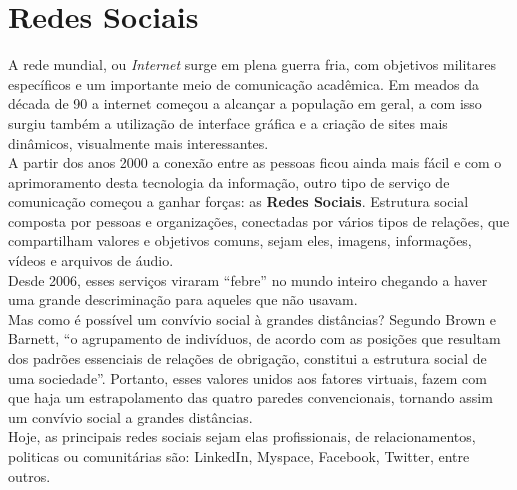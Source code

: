 \section{Redes Sociais}
A rede mundial, ou {\it Internet} surge em plena guerra fria, com objetivos militares específicos e um importante meio de comunicação acadêmica. Em meados da década de 90 a internet começou a alcançar a população em geral, a com isso surgiu também a utilização de interface gráfica e a criação de sites mais dinâmicos, visualmente mais interessantes.
\\
\indent
A partir dos anos 2000 a conexão entre as pessoas ficou ainda mais fácil e com o aprimoramento desta tecnologia da informação, outro tipo de serviço de comunicação começou a ganhar forças: as {\bf Redes Sociais}. Estrutura social composta por pessoas e organizações, conectadas por vários tipos de relações, que compartilham valores e objetivos comuns, sejam eles, imagens, informações, vídeos e arquivos de áudio.
\\
\indent
Desde 2006, esses serviços viraram “febre” no mundo inteiro chegando a haver uma grande descriminação para aqueles que não usavam.
\\
\indent
Mas como é possível um convívio social à grandes distâncias? Segundo Brown e Barnett, “o agrupamento de indivíduos, de acordo com as posições que resultam dos padrões essenciais de relações de obrigação, constitui a estrutura social de uma sociedade”. Portanto, esses valores unidos aos fatores virtuais, fazem com que haja um estrapolamento das quatro paredes convencionais, tornando assim um convívio social a grandes distâncias.
\\
\indent
Hoje, as principais redes sociais sejam elas profissionais, de relacionamentos, politicas ou comunitárias são: LinkedIn, Myspace, Facebook, Twitter, entre outros.

